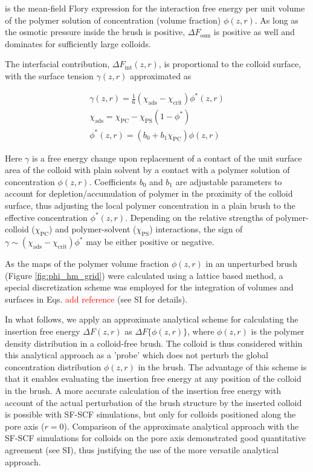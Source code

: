 \documentclass[12pt, a4paper]{article}
\newcommand\todo[1]{\textcolor{red}{#1}}
\begin{document}
\noindent is the mean-field Flory expression for the interaction free energy per unit volume of the polymer solution of concentration (volume fraction) $\phi(z,r)$.
As long as the osmotic pressure inside the brush is positive, $\Delta F_{\text{osm}}$ is positive as well and dominates for sufficiently large colloids. 

The interfacial contribution, $\Delta F_{\text{int}}(z,r)$, is proportional to the colloid surface, 
with the surface tension $\gamma (z,r)$ approximated as

\begin{eqnarray}
    \gamma (z,r)= \frac{1}{6}(\chi_{\text{ads}} - \chi_{\text{crit}})\phi^{\ast}(z,r)
    \\
    \chi_{\text{ads}} = \chi_{\text{PC}} - \chi_{\text{PS}}(1-\phi^{\ast})
    \\
    \phi^{\ast}(z,r)= (b_{0} + b_{1}\chi_{\text{PC}})\phi(z,r)
\end{eqnarray}

\noindent Here $\gamma$ is a free energy change upon replacement of a contact of the unit surface area of the colloid with plain solvent by a contact with a polymer solution of concentration $\phi(z,r)$.
Coefficients $b_0$ and $b_1$ are adjustable parameters to account for depletion/accumulation of polymer in the proximity of the colloid surface, 
thus adjusting the local polymer concentration in a plain brush to the effective concentration $\phi^{\ast}(z,r)$.
Depending on the relative strengths of polymer-colloid ($\chi_{\text{PC}}$) and polymer-solvent ($\chi_{\text{PS}}$) interactions, 
the sign of $\gamma\sim(\chi_{\text{ads}}-\chi_{\text{crit}})\phi^{\ast}$ may be either positive or negative.

As the maps of the polymer volume fraction $\phi(z,r)$ in an unperturbed brush (Figure \ref{fig:phi_hm_grid}) were calculated using a lattice based method, 
a special discretization scheme was employed for the integration of volumes and surfaces in Eqs. \todo{add reference} (see SI for details).

In what follows, we apply an approximate analytical scheme for calculating the insertion free energy $\Delta F(z,r)$ as $\Delta F\{\phi(z,r)\}$, 
where $\phi(z,r)$ is the polymer density distribution in a colloid-free brush. 
The colloid is thus considered within this analytical approach as a 'probe' which does not perturb the global concentration distribution $\phi(z,r)$ in the brush. 
The advantage of this scheme is that it enables evaluating the insertion free energy at any position of the colloid in the brush.
A more accurate calculation of the insertion free energy with account of the actual perturbation of the brush structure by the inserted colloid is possible with SF-SCF simulations,
but only for colloids positioned along the pore axis ($r=0$). 
Comparison of the approximate analytical approach with the SF-SCF simulations for colloids on the pore axis demonstrated good quantitative agreement (see SI), 
thus justifying the use of the more versatile analytical approach.
\end{document}
